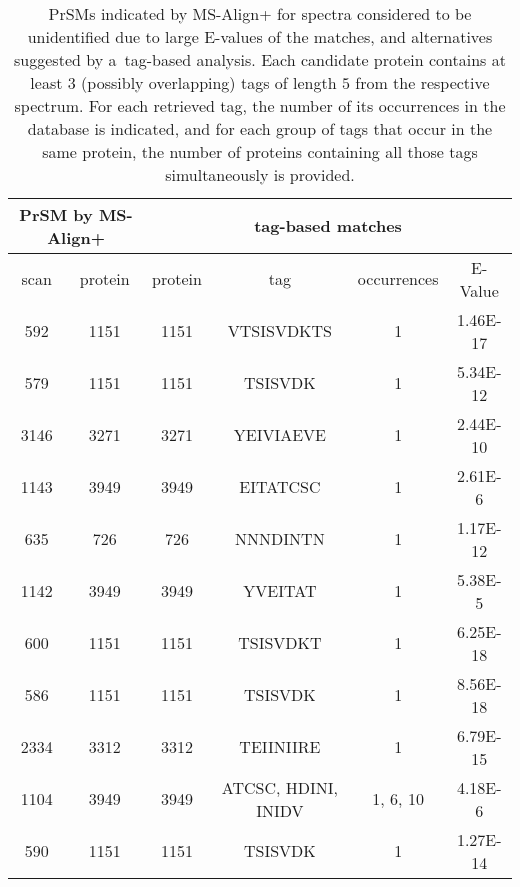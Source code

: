 \documentclass{article}
\begin{document}
\begin{landscape}

\begin{table}[h]\footnotesize
\vspace{3mm}\
{\centering
\begin{center}
\begin{tabular}{|c|c||c|c|c|c|}
  \hline
  \multicolumn{2}{|c||}{PrSM by MS-Align+} & \multicolumn{4}{|c|}{tag-based matches} \\
  \hline
  scan & protein & protein & tag & occurrences & E-Value\\

  \hline
592& 1151 & 1151& 
VTSISVDKTS & 1 & 1.46E-17\\
  \hline
579& 1151 & 1151& 
TSISVDK & 1 & 5.34E-12\\
  \hline
3146& 3271 & 3271& 
YEIVIAEVE & 1 & 2.44E-10\\
  \hline
1143& 3949 & 3949& 
EITATCSC & 1 & 2.61E-6\\
  \hline
635& 726 & 726& 
NNNDINTN & 1 & 1.17E-12\\
  \hline
1142& 3949 & 3949& 
YVEITAT & 1 & 5.38E-5\\
  \hline
600& 1151 & 1151& 
TSISVDKT & 1 & 6.25E-18\\
  \hline
586& 1151 & 1151& 
TSISVDK & 1 & 8.56E-18\\
  \hline
2334& 3312 & 3312& 
TEIINIIRE & 1 & 6.79E-15\\
  \hline
1104& 3949 & 3949& 
ATCSC, HDINI, INIDV & 1, 6, 10 & 4.18E-6\\
  \hline
590& 1151 & 1151& 
TSISVDK & 1 & 1.27E-14\\
\hline\end{tabular}
\end{center}
\par}
\centering
\caption{PrSMs indicated by MS-Align+ for spectra considered to be unidentified due to  large E-values of the matches, and alternatives suggested  by a~tag-based analysis. Each candidate protein contains at least $3$ (possibly overlapping) tags of length $5$ from the respective spectrum. For each retrieved tag, the number of its occurrences in the database is indicated, and for each group of tags that occur in the same protein, the number of proteins containing all those tags simultaneously is provided.}
\vspace{3mm}
\label{table:unident-spectra}
\end{table}
\end{landscape}
\end{document}
